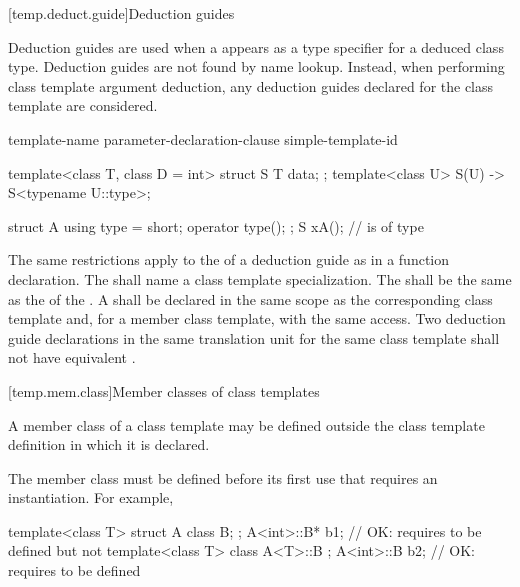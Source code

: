 [temp.deduct.guide]{Deduction guides}
%

\pnum
Deduction guides are used
when a  appears
as a type specifier
for a deduced class type.
Deduction guides are not found by name lookup.
Instead, when performing class template argument deduction,
any deduction guides declared for the class template are considered.

\begin{bnf}
\br
     template-name \terminal{(} parameter-declaration-clause \terminal{)} \terminal{->} simple-template-id \terminal{;}
\end{bnf}

\pnum
\begin{example}
\begin{codeblock}
template<class T, class D = int>
struct S {
  T data;
};
template<class U>
S(U) -> S<typename U::type>;

struct A {
  using type = short;
  operator type();
};
S x{A()};           //  is of type 
\end{codeblock}
\end{example}

\pnum
The same restrictions apply
to the 
of a deduction guide
as in a function declaration.
The 
shall name a class template specialization.
The 
shall be the same 
as the 
of the .
A 
shall be declared
in the same scope
as the corresponding class template
and, for a member class template, with the same access.
Two deduction guide declarations
in the same translation unit
for the same class template
shall not have equivalent .

[temp.mem.class]{Member classes of class templates}

\pnum
A member class of a class template may be defined outside the class template
definition in which it is declared.
\begin{note}
The member class must be defined before its first use that requires
an instantiation.
For example,
\begin{codeblock}
template<class T> struct A {
  class B;
};
A<int>::B* b1;                          // OK: requires  to be defined but not 
template<class T> class A<T>::B { };
A<int>::B  b2;                          // OK: requires  to be defined
\end{codeblock}
\end{note}

